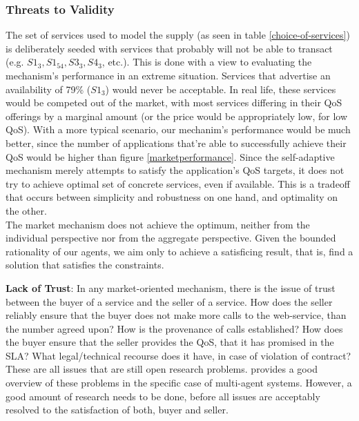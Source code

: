 \documentclass[10pt,journal,compsoc]{IEEEtran}
\begin{document}
\subsubsection{Threats to Validity}

The set of services used to model the supply (as seen in table \ref{choice-of-services}) is deliberately seeded with services that probably will not be able to transact (e.g. $S1_{3}, S1_{54}, S3_{3}, S4_{3}$, etc.). This is done with a view to evaluating the mechanism's performance in an extreme situation. Services that advertise an availability of 79\% ($S1_{3}$) would never be acceptable.  In real life, these services would be competed out of the market, with most services differing in their QoS offerings by a marginal amount (or the price would be appropriately low, for low QoS). With a more typical scenario, our mechanim's performance would be much better, since the number of applications that're able to successfully achieve their QoS would be higher than figure \ref{marketperformance}. Since the self-adaptive mechanism merely attempts to satisfy the application's QoS targets, it does not try to achieve  optimal set of concrete services, even if available. This is a tradeoff that occurs between simplicity and robustness on one hand, and optimality on the other.\\

The market mechanism does not achieve the optimum, neither from the individual perspective nor from the aggregate perspective. Given the bounded rationality of our agents, we aim only to achieve a satisficing result, that is, find a solution that satisfies the constraints. 

\textbf{Lack of Trust}: In any market-oriented mechanism, there is the issue of trust between the buyer of a service and the seller of a service. How does the seller reliably ensure that the buyer does not make more calls to the web-service, than the number agreed upon? How is the provenance of calls established? How does the buyer ensure that the seller provides the QoS, that it has promised in the SLA? What legal/technical recourse does it have, in case of violation of contract? These are all issues that are still open research problems. \cite{Ramchurn2005Trust} provides a good overview of these problems in the specific case of multi-agent systems. However, a good amount of research needs to be done, before all issues are acceptably resolved to the satisfaction of both, buyer and seller.\\
\end{document}
